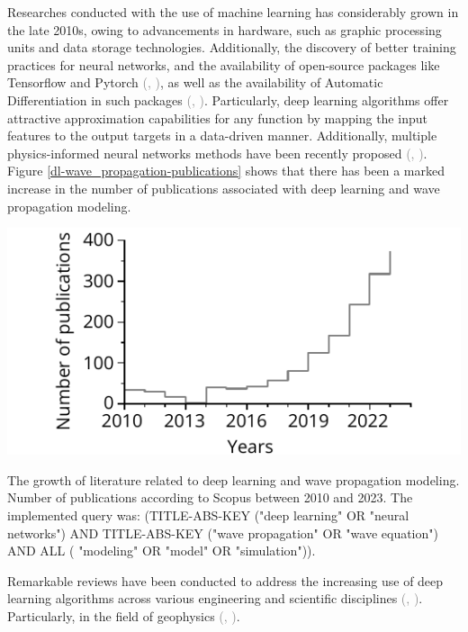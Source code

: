 \documentclass{tufte-handout}
\renewcommand{\citep}[2][]{\textcolor{gray}{(\citeauthor{#2}, \citeyear[#1]{#2})}}
\begin{document}
Researches conducted with the use of machine learning has considerably grown in the late 2010s, owing to advancements in hardware, such as graphic processing units and data storage technologies. Additionally, the discovery of better training practices for neural networks, and the availability of open-source packages like Tensorflow and Pytorch \citep{abadi_tensorflow_2016,paszke_pytorch_2019}, as well as the availability of Automatic Differentiation in such packages \citep{paszke_automatic_2017,baydin_automatic_2017}. Particularly, deep learning algorithms offer attractive approximation capabilities for any function by mapping the input features to the output targets in a data-driven manner. Additionally, multiple physics-informed neural networks methods have been recently proposed \citep{cuomo_scientific_2022}. Figure \ref{dl-wave_propagation-publications} shows that there has been a marked increase in the number of publications associated with deep learning and wave propagation modeling.

\begin{marginfigure}
    \includegraphics[scale=1]{figs/n_publications.pdf}
    \caption{The growth of literature related to deep learning and wave propagation modeling. Number of publications according to Scopus between 2010 and 2023. The implemented query was: (TITLE-ABS-KEY ("deep learning"  OR  "neural networks")  AND  TITLE-ABS-KEY ("wave propagation"  OR  "wave equation")  AND  ALL ( "modeling"  OR  "model"  OR  "simulation")).}
    \label{dl-wave_propagation-publications}
\end{marginfigure}

Remarkable reviews have been conducted to address the increasing use of deep learning algorithms across various engineering and scientific disciplines \citep{vadyala_review_2022,deng_physics-informed_2023,lino_current_2023}. Particularly, in the field of geophysics \citep{yu_deep_2021,lin_physics-guided_2023}. 
\end{document}
